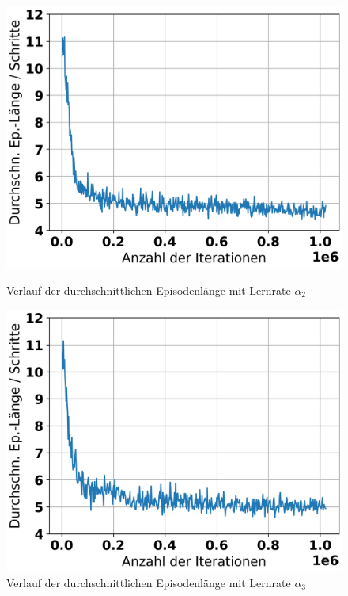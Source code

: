 \begin{figure}[H]
	\begin{minipage}[c]{0.48\linewidth}
		\includegraphics[width=\linewidth]{Bilder/random-training/history_random_0_0005_graph_episode_lengths.png}
		\caption{Verlauf der durchschnittlichen Episodenlänge mit Lernrate $\alpha_2$}
	\end{minipage}
	\hfill
	\begin{minipage}[c]{0.48\linewidth}
		\includegraphics[width=\linewidth]{Bilder/random-training/history_random_0_0001_graph_episode_lengths.png}
		\caption{Verlauf der durchschnittlichen Episodenlänge mit Lernrate $\alpha_3$}
	\end{minipage}
\end{figure}


